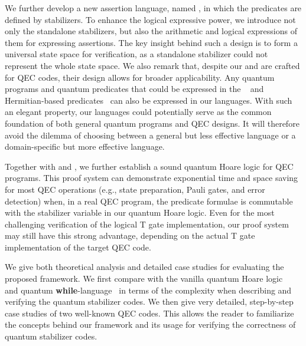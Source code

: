 We further develop a new assertion language, named {\assnname}, in which the predicates are defined by stabilizers.
To enhance the logical expressive power, we introduce not only the standalone stabilizers, but also the arithmetic and logical expressions of them for expressing assertions.
The key insight behind such a design is to form a universal state space for verification, as a standalone stabilizer could not represent the whole state space. 
We also remark that, despite our {\langname} and {\assnname} are crafted for QEC codes, their design allows for broader applicability. Any quantum programs and quantum predicates that could be expressed in the {\qwhilelang}~\cite{Ying2012FloydhoareLF} and Hermitian-based predicates~\cite{DHondt2006QuantumWP} can also be %
expressed in our languages. With such an elegant property, our languages could potentially serve as the common foundation of both general quantum programs and QEC designs. It will therefore avoid the dilemma of choosing
between a general but less effective language or a domain-specific but more effective language. 


Together with {\langname} and {\assnname}, we further establish a sound quantum Hoare logic for QEC programs. 
This proof system can demonstrate exponential time and space saving for most QEC operations (e.g., state preparation, Pauli gates, and error detection) when, in a real QEC program, the predicate formulae is commutable with the stabilizer variable in our quantum Hoare logic.
Even for the most challenging verification of the logical T gate implementation, our proof system may still have this strong advantage, depending on the actual T gate implementation of the target QEC code.






We give both theoretical analysis and detailed case studies for evaluating the proposed framework. 
We first compare {\myFrameworkName} with the vanilla quantum Hoare logic~\cite{Ying2012FloydhoareLF} and quantum \textbf{while}-language~\cite{Ying2012FloydhoareLF} in terms of the complexity when describing and verifying the quantum stabilizer codes. 
We then give very detailed, step-by-step case studies of two well-known QEC codes. This allows the reader to familiarize the concepts behind our framework and its usage for verifying the correctness of quantum stabilizer codes.


